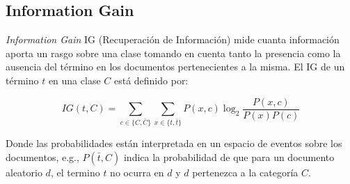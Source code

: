 \subsection{Information Gain}

	\textit{Information Gain }IG (Recuperación de Información) \citep{10.5555/3091696.3091731,sebastiani2002machine} mide cuanta información aporta un rasgo sobre una clase tomando en cuenta tanto la presencia como la ausencia del término en los documentos pertenecientes a la misma. El IG de un término $t$ en una clase $C$ está definido por:
	
	\begin{equation}
		IG(t, C) = \sum_{c \in \{C, \bar{C}\}} \sum_{x \in \{t, \bar{t}\}} P(x, c) \log_2\frac{P(x, c)}{P(x)P(c)}
	\end{equation}

	Donde las probabilidades están interpretada en un espacio de eventos sobre los documentos, e.g., $P(\bar{t}, C)$ indica la probabilidad de que para un documento aleatorio $d$, el termino $t$ no ocurra en $d$ y $d$ pertenezca a la categoría $C$. 